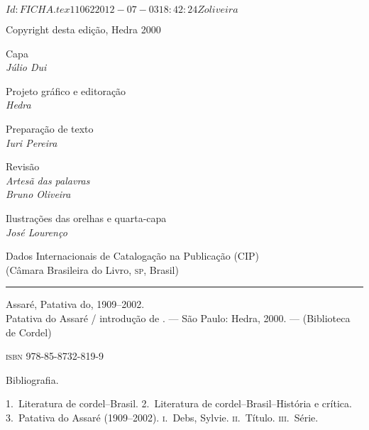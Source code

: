 \SVN $Id: FICHA.tex 11062 2012-07-03 18:42:24Z oliveira $

\pagebreak

\begingroup \fontsize{9pt}{.86\baselineskip}\selectfont \parskip=0pt\thispagestyle{empty} 

\begin{center}
Copyright\raisebox{-1.2mm}{$^\copyright$}  desta edição, Hedra 2000\\\smallskip

Capa\\
\textit{Júlio Dui}\\\smallskip

Projeto gráfico e editoração\\
\textit{Hedra}\\\smallskip

Preparação de texto\\
\textit{Iuri Pereira}\\\smallskip

Revisão\\
\textit{Artesã das palavras}\\
\textit{Bruno Oliveira}\\\smallskip

Ilustrações das orelhas e quarta-capa\\
\textit{José Lourenço}\\\medskip

\begin{minipage}{.8\textwidth}
\fontsize{7pt}{7pt}\selectfont
Dados Internacionais de Catalogação na Publicação (CIP)\\
(Câmara Brasileira do Livro, \textsc{sp}, Brasil)\\
\mbox{}\vspace{-0.2ex}\hrule\vspace{1ex}

Assaré, Patativa do, 1909--2002.\\
\makeatletter Patativa do Assaré / introdução de \@introdutor\makeatother.
--- São Paulo: Hedra, 2000. --- (Biblioteca de Cordel)

\smallskip

\textsc{isbn} 978-85-8732-819-9

\smallskip

Bibliografia.

1.~Literatura de cordel--Brasil. 2.~Literatura de
cordel--Brasil--História e crítica. 3.~Patativa do Assaré
(1909--2002). \textsc{i}.~Debs, Sylvie. \textsc{ii}.~Título.
\textsc{iii}.~Série.


\end{minipage}
\end{center}
